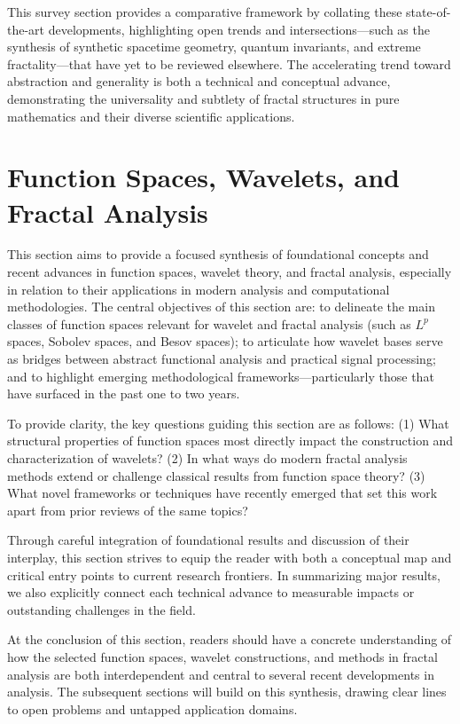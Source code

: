 \documentclass[sigconf]{acmart}
\begin{document}
This survey section provides a comparative framework by collating these state-of-the-art developments, highlighting open trends and intersections—such as the synthesis of synthetic spacetime geometry, quantum invariants, and extreme fractality—that have yet to be reviewed elsewhere. The accelerating trend toward abstraction and generality is both a technical and conceptual advance, demonstrating the universality and subtlety of fractal structures in pure mathematics and their diverse scientific applications.

\section{Function Spaces, Wavelets, and Fractal Analysis}

This section aims to provide a focused synthesis of foundational concepts and recent advances in function spaces, wavelet theory, and fractal analysis, especially in relation to their applications in modern analysis and computational methodologies. The central objectives of this section are: to delineate the main classes of function spaces relevant for wavelet and fractal analysis (such as $L^p$ spaces, Sobolev spaces, and Besov spaces); to articulate how wavelet bases serve as bridges between abstract functional analysis and practical signal processing; and to highlight emerging methodological frameworks—particularly those that have surfaced in the past one to two years.

To provide clarity, the key questions guiding this section are as follows: (1) What structural properties of function spaces most directly impact the construction and characterization of wavelets? (2) In what ways do modern fractal analysis methods extend or challenge classical results from function space theory? (3) What novel frameworks or techniques have recently emerged that set this work apart from prior reviews of the same topics?

Through careful integration of foundational results and discussion of their interplay, this section strives to equip the reader with both a conceptual map and critical entry points to current research frontiers. In summarizing major results, we also explicitly connect each technical advance to measurable impacts or outstanding challenges in the field.

At the conclusion of this section, readers should have a concrete understanding of how the selected function spaces, wavelet constructions, and methods in fractal analysis are both interdependent and central to several recent developments in analysis. The subsequent sections will build on this synthesis, drawing clear lines to open problems and untapped application domains.
\end{document}
